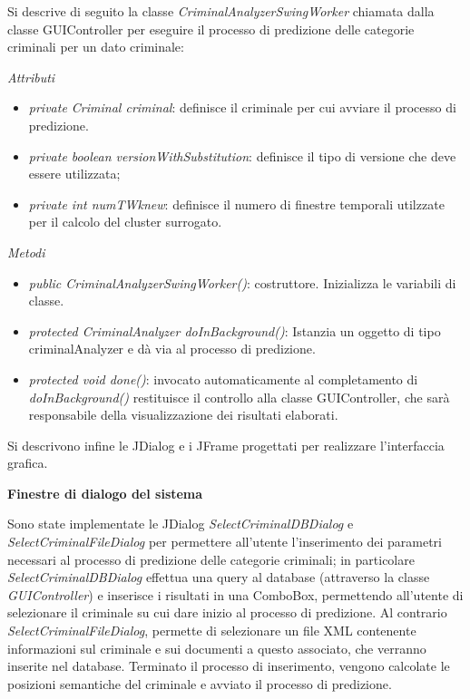 Si descrive di seguito la classe \textit{CriminalAnalyzerSwingWorker} chiamata dalla classe GUIController per eseguire il processo di predizione delle categorie criminali per un dato criminale:

\textit{Attributi}

\begin{itemize}
	\item  \textit{private Criminal criminal}: definisce il criminale per cui avviare il processo di predizione.
	\item \textit{private boolean versionWithSubstitution}: definisce il tipo di versione che deve essere utilizzata;
	\item \textit{private int numTWknew}: definisce il numero di finestre temporali utilzzate per il calcolo del cluster surrogato.
\end{itemize}

\textit{Metodi}

\begin{itemize}
	\item \textit{public CriminalAnalyzerSwingWorker()}: costruttore. Inizializza le variabili di classe.
	\item \textit{protected CriminalAnalyzer doInBackground()}: Istanzia un oggetto di tipo criminalAnalyzer e dà via al processo di predizione.
	\item \textit{protected void done()}: invocato automaticamente al completamento di \textit{doInBackground()} restituisce il controllo alla classe GUIController, che sarà responsabile della visualizzazione dei risultati elaborati.
\end{itemize}

Si descrivono infine le JDialog e i JFrame progettati per realizzare l'interfaccia grafica.

\textbf{Finestre di dialogo del sistema}

Sono state implementate le JDialog \textit{SelectCriminalDBDialog} e \textit{SelectCriminalFileDialog} per permettere all'utente l'inserimento dei parametri necessari al processo di predizione delle categorie criminali; in particolare \textit{SelectCriminalDBDialog} effettua una query al database (attraverso la classe  \textit{GUIController}) e inserisce i risultati in una ComboBox, permettendo all'utente di selezionare il criminale su cui dare inizio al processo di predizione. Al contrario \textit{SelectCriminalFileDialog}, permette di selezionare un file XML contenente informazioni sul criminale e sui documenti a questo associato, che verranno inserite nel database. Terminato il processo di inserimento, vengono calcolate le posizioni semantiche del criminale e avviato il processo di predizione.

